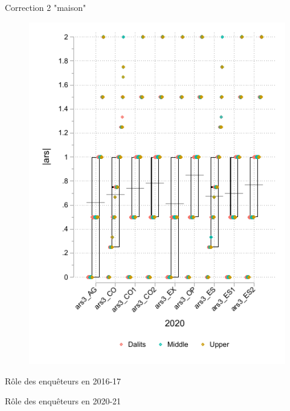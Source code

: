 \documentclass[aspectratio=169]{beamer}
\begin{document}
\begin{frame}[plain, shrink=2]{Correction 2 "maison"}
\begin{figure}[H]
\begin{columns}[T]
\begin{column}{.5\linewidth}
            \includegraphics[width=\linewidth]{INPUT/boxplotars2020_det.pdf}
        \end{column}
    \end{columns}
\end{figure}
 \end{frame}



\begin{frame}[plain, shrink=2]{Rôle des enquêteurs en 2016-17}

\end{frame}



\begin{frame}[plain, shrink=2]{Rôle des enquêteurs en 2020-21}

\end{frame}
\end{document}
